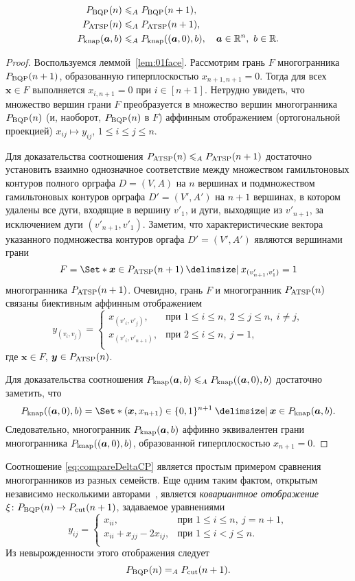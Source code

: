 \begin{prop}
\begin{align*}
P_{\textup{BQP}}(n) &\leqslant_A P_{\textup{BQP}}(n+1),\\
P_{\textup{ATSP}}(n) &\leqslant_A P_{\textup{ATSP}}(n+1),\\
P_{\textup{knap}}(\bm{a}, b) &\leqslant_A P_{\textup{knap}}((\bm{a},0), b), \quad \bm{a} \in \mathbb{R}^{n}, \ b\in \mathbb{R}.
\end{align*}
\end{prop}
\begin{proof}
Воспользуемся леммой~\ref{lem:01face}.
Рассмотрим грань $F$ многогранника $P_{\textup{BQP}}(n+1)$, образованную гиперплоскостью $x_{n+1, n+1} = 0$. 
Тогда для всех $\bm{x} \in F$ выполняется $x_{i, n+1} = 0$ при $i\in[n+1]$.
Нетрудно увидеть, что множество вершин грани $F$ преобразуется в множество вершин многогранника $P_{\textup{BQP}}(n)$ (и, наоборот, $P_{\textup{BQP}}(n)$ в $F$) аффинным отображением (ортогональной проекцией) $x_{ij} \mapsto y_{ij}$, $1 \le i \le j \le n$. 

Для доказательства соотношения $P_{\textup{ATSP}}(n) \leqslant_A P_{\textup{ATSP}}(n+1)$ 
достаточно установить взаимно однозначное соответствие между множеством гамильтоновых контуров полного орграфа $D=(V,A)$ на $n$ вершинах и подмножеством 
гамильтоновых контуров орграфа $D'=(V',A')$ на $n+1$ вершинах, в котором удалены все дуги, входящие в вершину $v'_1$, и дуги, выходящие из $v'_{n+1}$, за исключением дуги $(v'_{n+1}, v'_1)$.
Заметим, что характеристические вектора указанного подмножества контуров оргафа $D'=(V',A')$ являются вершинами грани 
\[F = \Set*{\bm{x} \in \ATSP(n+1) \given x_{(v'_{n+1}, v'_1)} = 1}
\]
многогранника $P_{\textup{ATSP}}(n+1)$.
Очевидно, грань $F$ и многогранник $P_{\textup{ATSP}}(n)$ связаны биективным аффинным отображением
\[
	y_{(v_i, v_j)} = 
	\begin{cases}
	x_{(v'_i, v'_j)}, & \text{при }1 \le i \le n, \ 2 \le j \le n, \ i \ne j,\\
	x_{(v'_i, v'_{n+1})}, & \text{при }2 \le i \le n, \ j=1,\\
	\end{cases}
\]
где $\bm{x} \in F$, $\bm{y} \in P_{\textup{ATSP}}(n)$.

Для доказательства соотношения $P_{\textup{knap}}(\bm{a}, b) \leqslant_A P_{\textup{knap}}((\bm{a},0), b)$ достаточно заметить, что 
\[
\Knap((\bm{a},0), b) = \Set*{(\bm{x},x_{n+1}) \in \{0,1\}^{n+1} \given \bm{x} \in \Knap(\bm{a}, b)}.
\]
Следовательно, многогранник $P_{\textup{knap}}(\bm{a}, b)$ аффинно эквивалентен грани многогранника $P_{\textup{knap}}((\bm{a},0), b)$, образованной гиперплоскостью $x_{n+1} = 0$.
\end{proof}

Соотношение \eqref{eq:compareDeltaCP} является простым примером сравнения многогранников из разных семейств.
Еще одним таким фактом, открытым независимо несколькими авторами~\cite[с.~84]{Deza:2001}, является \emph{ковариантное отображение} $\xi\colon P_{\textup{BQP}}(n) \to P_{\textup{cut}}(n+1)$, задаваемое уравнениями
\[
y_{ij} = 
\begin{cases}
x_{ii}, & \text{при } 1 \le i \le n, \ j=n+1,\\
x_{ii} + x_{jj} - 2 x_{ij}, & \text{при } 1 \le i < j \le n.\\
\end{cases}
\]
Из невырожденности этого отображения следует
\[
P_{\textup{BQP}}(n) =_A P_{\textup{cut}}(n+1).
\]

